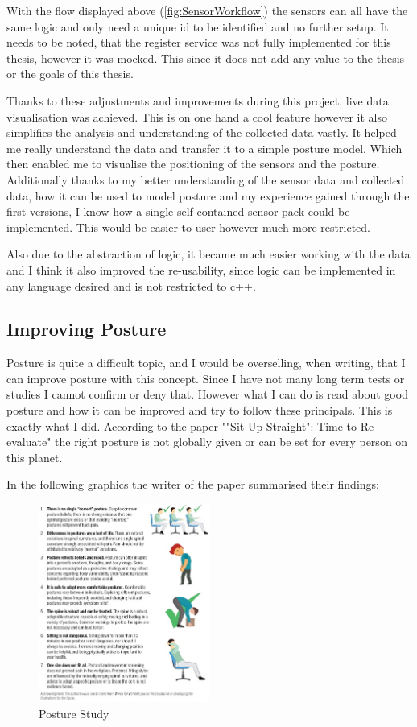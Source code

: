 With the flow displayed above (\ref{fig:SensorWorkflow}) the sensors can all have the same logic and only need  a unique id to be identified and no further setup. It needs to be noted, that the register service was not fully implemented for this thesis, however it was mocked. This since it does not add any value to the thesis or the goals of this thesis.

Thanks to these adjustments and improvements during this project, live data visualisation was achieved. This is on one hand a cool feature however it also simplifies the analysis and understanding of the collected data vastly. It helped me really understand the data and transfer it to a simple posture model. Which then enabled me to visualise the positioning of the sensors and the posture. Additionally thanks to my better understanding of the sensor data and collected data, how it can be used to model posture and my experience gained through the first versions, I know how a single self contained sensor pack could be implemented. This would be easier to user however much more restricted. 

Also due to the abstraction of logic, it became much easier working with the data and I think it also improved the re-usability, since logic can be implemented in any language desired and is not restricted to c++.

\subsection{Improving Posture}

Posture is quite a difficult topic, and I would be overselling, when writing, that I can improve posture with this concept. Since I have not many long term tests or studies I cannot confirm or deny that. However what I can do is read about good posture and how it can be improved and try to follow these principals. This is exactly what I did. According to the paper ""Sit Up Straight": Time to Re-evaluate" \cite{SitUpSt77:online} the right posture is not globally given or can be set for every person on this planet. 

In the following graphics the writer of the paper summarised their findings:
\begin{figure}[h]
  \begin{center}
\includegraphics[width=0.5\textwidth]{images/jospt-562-fig001.jpg}
  \end{center}
  \caption{Posture Study}
  \label{fig:Posture Study}
\end{figure}

